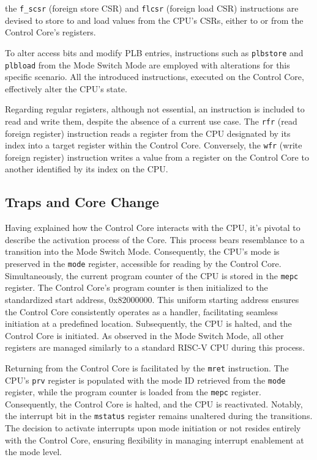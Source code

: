 the \texttt{f_scsr} (foreign store CSR) and \texttt{flcsr} (foreign load CSR)
instructions are devised to store to and load values from the CPU's CSRs, either
to or from the Control Core's registers.\par
To alter access bits and modify PLB entries, instructions such as
\texttt{plbstore} and \texttt{plbload} from the Mode Switch Mode are employed
with alterations for this specific scenario. All the introduced instructions,
executed on the Control Core, effectively alter the CPU's state.\par
Regarding regular registers, although not essential, an instruction is included
to read and write them, despite the absence of a current use case. The
\texttt{rfr} (read foreign register) instruction reads a register from the CPU
designated by its index into a target register within the Control Core.
Conversely, the \texttt{wfr} (write foreign register) instruction writes a value
from a register on the Control Core to another identified by its index on the
CPU.


\subsection{Traps and Core Change}
Having explained how the Control Core interacts with the CPU, it's pivotal to
describe the activation process of the Core. This process bears resemblance to a
transition into the Mode Switch Mode. Consequently, the CPU's mode is preserved
in the \texttt{mode} register, accessible for reading by the Control Core.
Simultaneously, the current program counter of the CPU is stored in the
\texttt{mepc} register. The Control Core's program counter is then initialized
to the standardized start address, 0x82000000. This uniform starting address
ensures the Control Core consistently operates as a handler, facilitating
seamless initiation at a predefined location. Subsequently, the CPU is halted,
and the Control Core is initiated. As observed in the Mode Switch Mode, all
other registers are managed similarly to a standard RISC-V CPU during this
process.\par
Returning from the Control Core is facilitated by the \texttt{mret} instruction.
The CPU's \texttt{prv} register is populated with the mode ID retrieved from the
\texttt{mode} register, while the program counter is loaded from the
\texttt{mepc} register. Consequently, the Control Core is halted, and the CPU is
reactivated. Notably, the interrupt bit in the \texttt{mstatus} register remains
unaltered during the transitions. The decision to activate interrupts upon mode
initiation or not resides entirely with the Control Core, ensuring flexibility
in managing interrupt enablement at the mode level. 
